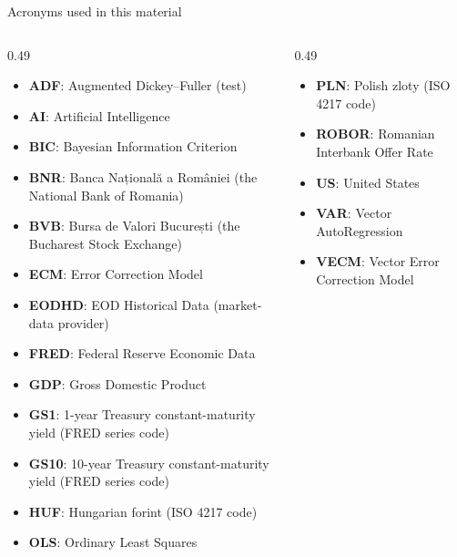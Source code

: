 {
\begin{frame}[noframenumbering]
    \titlepage
\end{frame}
}
\begin{frame}{Acronyms used in this material}
\begin{columns}[T]
\begin{column}{0.49\textwidth}
\begin{itemize}\setlength{\itemsep}{0pt}
    \item \textbf{ADF}: Augmented Dickey–Fuller (test)
    \item \textbf{AI}: Artificial Intelligence
    \item \textbf{BIC}: Bayesian Information Criterion
    \item \textbf{BNR}: Banca Națională a României (the National Bank of Romania)
    \item \textbf{BVB}: Bursa de Valori București (the Bucharest Stock Exchange)
    \item \textbf{ECM}: Error Correction Model
    \item \textbf{EODHD}: EOD Historical Data (market-data provider)
    \item \textbf{FRED}: Federal Reserve Economic Data
    \item \textbf{GDP}: Gross Domestic Product
    \item \textbf{GS1}: 1-year Treasury constant-maturity yield (FRED series code)
    \item \textbf{GS10}: 10-year Treasury constant-maturity yield (FRED series code)
    \item \textbf{HUF}: Hungarian forint (ISO 4217 code)
    \item \textbf{OLS}: Ordinary Least Squares
\end{itemize}
\end{column}
\begin{column}{0.49\textwidth}
\begin{itemize}\setlength{\itemsep}{0pt}
    \item \textbf{PLN}: Polish zloty (ISO 4217 code)
    \item \textbf{ROBOR}: Romanian Interbank Offer Rate
    \item \textbf{US}: United States
    \item \textbf{VAR}: Vector AutoRegression
    \item \textbf{VECM}: Vector Error Correction Model
\end{itemize}
\end{column}
\end{columns}
\end{frame}

